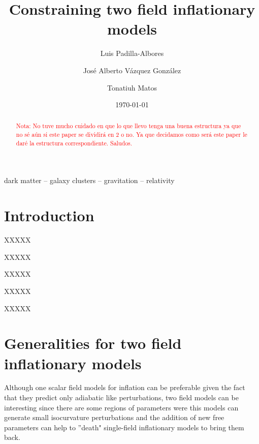 \documentclass[twocolumn,           %
               showpacs,            %
               preprintnumbers,     %
               aps,                 %
               prl,          	    %
               letterpaper,             %
               superscriptaddress,      %
               nofootinbib,         %
               tightenlines,        %
               floats,floatfix      %
               ,usenatbib,
               ]{revtex4-1}
\begin{document}
\title{Constraining two field inflationary models}
\author{Luis Padilla-Albores}  
   \author{Jos\'e Alberto V\'azquez Gonz\'alez}  
\author{Tonatiuh Matos}  
\date{\today}

\begin{abstract}
\textcolor{red}{Nota: No tuve mucho cuidado en que lo que llevo tenga una buena estructura ya que no s\'e a\'un si este paper se dividir\'a en 2 o no. Ya que decidamos como ser\'a este paper le dar\'e la estructura correspondiente. Saludos.}

\end{abstract}
\begin{keywords}
dark matter  -- galaxy clusters --  gravitation  -- relativity
\end{keywords}

\maketitle



\section{Introduction}
\label{introduction}

XXXXX

XXXXX

XXXXX

XXXXX

XXXXX

\section{Generalities for two field inflationary models}

Although one scalar field models for inflation can be preferable given the fact that they predict only adiabatic like perturbations, two field models can be interesting since there are some regions of parameters were this models can generate small isocurvature perturbations and the addition of new free parameters can help to ''death" single-field inflationary models to bring them back.  
\end{document}
